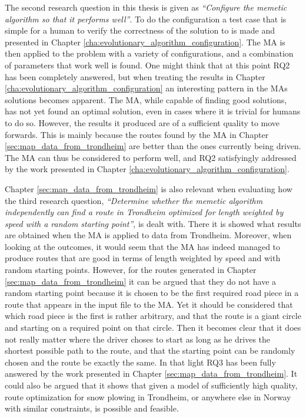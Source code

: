 The second research question in this thesis is given as \emph{\enquote{Configure the memetic algorithm so that it performs well}}. To do the configuration a test case that is simple for a human to verify the correctness of the solution to is made and presented in Chapter \ref{cha:evolutionary_algorithm_configuration}. The MA is then applied to the problem with a variety of configurations, and a combination of parameters that work well is found. One might think that at this point RQ2 has been completely answered, but when treating the results in Chapter \ref{cha:evolutionary_algorithm_configuration} an interesting pattern in the MAs solutions becomes apparent. The MA, while capable of finding good solutions, has not yet found an optimal solution, even in cases where it is trivial for humans to do so. However, the results it produced are of a sufficient quality to move forwards. This is mainly because the routes found by the MA in Chapter \ref{sec:map_data_from_trondheim} are better than the ones currently being driven. The MA can thus be considered to perform well, and RQ2 satisfyingly addressed by the work presented in Chapter \ref{cha:evolutionary_algorithm_configuration}.

Chapter \ref{sec:map_data_from_trondheim} is also relevant when evaluating how the third research question, \emph{\enquote{Determine whether the memetic algorithm independently can find a route in Trondheim optimized for length weighted by speed with a random starting point}}, is dealt with. There it is showed what results are obtained when the MA is applied to data from Trondheim. Moreover, when looking at the outcomes, it would seem that the MA has indeed managed to produce routes that are good in terms of length weighted by speed and with random starting points. However, for the routes generated in Chapter \ref{sec:map_data_from_trondheim} it can be argued that they do not have a random starting point because it is chosen to be the first required road piece in a route that appears in the input file to the MA. Yet it should be considered that which road piece is the first is rather arbitrary, and that the route is a giant circle and starting on a required point on that circle. Then it becomes clear that it does not really matter where the driver choses to start as long as he drives the shortest possible path to the route, and that the starting point can be randomly chosen and the route be exactly the same. In that light RQ3 has been fully answered by the work presented in Chapter \ref{sec:map_data_from_trondheim}. It could also be argued that it shows that given a model of sufficiently high quality, route optimization for snow plowing in Trondheim, or anywhere else in Norway with similar constraints, is possible and feasible.

